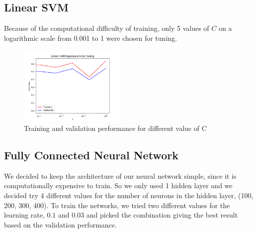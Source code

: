 \documentclass[letterpaper, 10 pt, conference]{ieeeconf}  %
\begin{document}
\subsection{Linear SVM}
Because of the computational difficulty of training, only 5 values of $C$ on a logarithmic scale from 0.001 to 1 were chosen for tuning. 
\begin{figure}[h]
	\begin{center}
		\includegraphics[width=0.45\textwidth]{figures/svm_tuning.png}  %
		\caption{Training and validation performance for different value of C}
		\label{fig:svmtuning}
	\end{center}
\end{figure}

\subsection{Fully Connected Neural Network}
We decided to keep the architecture of our neural network simple, since it is computationally expensive to train. So we only used 1 hidden layer and we decided try 4 different values for the number of neurons in the hidden layer, (100, 200, 300, 400).
To train the networks, we tried two different values for the learning rate, $0.1$ and $0.03$ and picked the combination giving the best result based on the validation performance.
\end{document}
